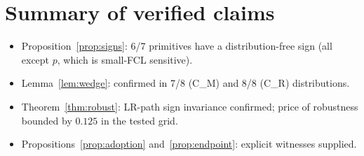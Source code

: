 \documentclass[11pt]{article}
\begin{document}
\section*{Summary of verified claims}
\begin{itemize}
\item Proposition~\ref{prop:signs}: 6/7 primitives have a distribution-free
sign (all except $p$, which is small-FCL sensitive).
\item Lemma~\ref{lem:wedge}: confirmed in 7/8 (C\_M) and 8/8 (C\_R) distributions.
\item Theorem~\ref{thm:robust}: LR-path sign invariance confirmed; price of
robustness bounded by $0.125$ in the tested grid.
\item Propositions~\ref{prop:adoption} and~\ref{prop:endpoint}: explicit
witnesses supplied.
\end{itemize}
\end{document}
